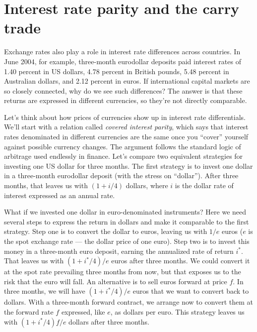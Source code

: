 \section{Interest rate parity and the carry trade}


Exchange rates also play a role in interest rate differences across
countries. In June 2004, for example, three-month eurodollar deposits
paid interest rates of 1.40 percent in US dollars, 4.78 percent in British
pounds, 5.48 percent in Australian dollars, and 2.12 percent in euros. If
international capital markets are so closely connected, why do we see
such differences?  The answer is that these returns are
expressed in different currencies, so they're not directly comparable.

Let's think about how prices of currencies show up in interest rate
differentials. We'll start with a relation called {\em covered
interest parity}, which says that interest rates denominated in
different currencies are the same once you ``cover'' yourself
against possible currency changes.  The argument follows the
standard logic of arbitrage used endlessly in finance.  Let's
compare two equivalent strategies for investing one US dollar for three
months. The first strategy is to invest one dollar in a three-month
eurodollar deposit (with the stress on ``dollar''). After three
months, that leaves us with $(1+i/4)$  dollars, where $i$ is the
dollar rate of interest expressed as an annual rate.

What if we invested one dollar in euro-denominated instruments? Here
we need several steps to express the return in dollars and make it
comparable to the first strategy. Step one is to convert the dollar
to euros, leaving us with $1/e$ euros
($e$ is the spot exchange rate --- the dollar price of one euro).
Step two is to invest this money
in a three-month euro deposit, earning the annualized rate of return
$i^{*}$. That leaves us with $(1+i^{*}/4)/e$ euros after three
months. We could convert it at the spot rate prevailing three months
from now, but that exposes us to the risk that the euro will fall.
An alternative is to sell euros forward at price $f$. In three
months, we will have $(1+i^{*}/4)/e$ euros that we want to convert
back to dollars. With a three-month forward contract, we arrange now
to convert them at the forward rate $f$ expressed, like $e$, as
dollars per euro. This strategy leaves us with $(1+i^{*}/4)f/e$
dollars after three months.

